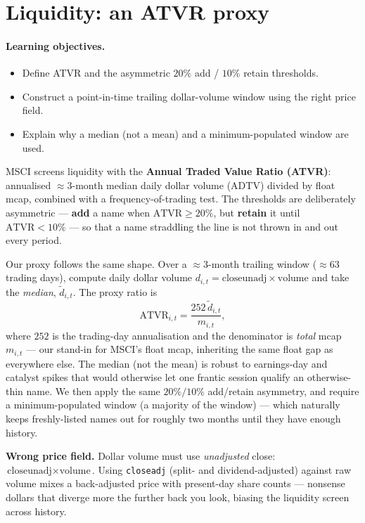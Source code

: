 \documentclass[11pt]{article}
\theoremstyle{definition}
\theoremstyle{plain}
\theoremstyle{remark}
\begin{document}
\section{Liquidity: an ATVR proxy}\label{sec:liq}

\paragraph{Learning objectives.}
\begin{itemize}[nosep,leftmargin=1.4em]
  \item Define ATVR and the asymmetric $20\%$ add / $10\%$ retain thresholds.
  \item Construct a point-in-time trailing dollar-volume window using the right price field.
  \item Explain why a median (not a mean) and a minimum-populated window are used.
\end{itemize}

MSCI screens liquidity with the \textbf{Annual Traded Value Ratio (ATVR)}: annualised $\approx$3-month median daily dollar volume (ADTV) divided by float mcap, combined with a frequency-of-trading test. The thresholds are deliberately asymmetric --- \textbf{add} a name when $\text{ATVR}\ge 20\%$, but \textbf{retain} it until $\text{ATVR} < 10\%$ --- so that a name straddling the line is not thrown in and out every period.

Our proxy follows the same shape. Over a $\approx$3-month trailing window ($\approx 63$ trading days), compute daily dollar volume $d_{i,t}=\text{closeunadj}\times\text{volume}$ and take the \emph{median}, $\widetilde d_{i,t}$. The proxy ratio is
\[
\text{ATVR}_{i,t} = \frac{252\,\widetilde d_{i,t}}{m_{i,t}},
\]
where $252$ is the trading-day annualisation and the denominator is \emph{total} mcap $m_{i,t}$ --- our stand-in for MSCI's float mcap, inheriting the same float gap as everywhere else. The median (not the mean) is robust to earnings-day and catalyst spikes that would otherwise let one frantic session qualify an otherwise-thin name. We then apply the same $20\%/10\%$ add/retain asymmetry, and require a minimum-populated window (a majority of the window) --- which naturally keeps freshly-listed names out for roughly two months until they have enough history.

\begin{pitfall}
\textbf{Wrong price field.} Dollar volume must use \emph{unadjusted} close: $\text{closeunadj}\times\text{volume}$. Using \texttt{closeadj} (split- and dividend-adjusted) against raw volume mixes a back-adjusted price with present-day share counts --- nonsense dollars that diverge more the further back you look, biasing the liquidity screen across history.
\end{pitfall}
\end{document}
